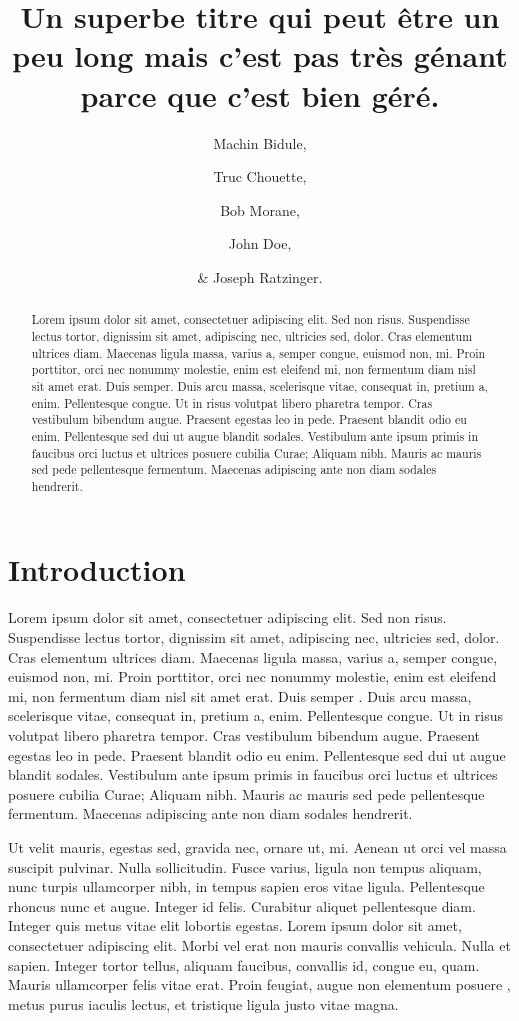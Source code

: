 \documentclass[a4paper,12pt]{article}
\title{Un superbe titre qui peut être un peu long mais c'est pas très génant parce que
  c'est bien géré.}
\author{Machin Bidule, \and Truc Chouette, \and Bob Morane, \and John Doe, \and \& Joseph
  Ratzinger.}
\begin{document}
\maketitle


\begin{abstract}
  Lorem ipsum dolor sit amet, consectetuer adipiscing elit. Sed non risus. Suspendisse
  lectus tortor, dignissim sit amet, adipiscing nec, ultricies sed, dolor. Cras elementum
  ultrices diam. Maecenas ligula massa, varius a, semper congue, euismod non, mi. Proin
  porttitor, orci nec nonummy molestie, enim est eleifend mi, non fermentum diam nisl sit
  amet erat. Duis semper. Duis arcu massa, scelerisque vitae, consequat in, pretium a,
  enim. Pellentesque congue. Ut in risus volutpat libero pharetra tempor. Cras vestibulum
  bibendum augue. Praesent egestas leo in pede. Praesent blandit odio eu
  enim. Pellentesque sed dui ut augue blandit sodales. Vestibulum ante ipsum primis in
  faucibus orci luctus et ultrices posuere cubilia Curae; Aliquam nibh. Mauris ac mauris
  sed pede pellentesque fermentum. Maecenas adipiscing ante non diam sodales hendrerit.
\end{abstract}


\newpage


\section*{Introduction}

Lorem ipsum dolor sit amet, consectetuer adipiscing elit. Sed non risus. Suspendisse
lectus tortor, dignissim sit amet, adipiscing nec, ultricies sed, dolor. Cras elementum
ultrices diam. Maecenas ligula massa, varius a, semper congue, euismod non, mi. Proin
porttitor, orci nec nonummy molestie, enim est eleifend mi, non fermentum diam nisl sit
amet erat. Duis semper \citep{Bivand_2007,Broeseth_2007_REP}. Duis arcu massa, scelerisque
vitae, consequat in, pretium a, enim. Pellentesque congue. Ut in risus volutpat libero
pharetra tempor. Cras vestibulum bibendum augue. Praesent egestas leo in pede. Praesent
blandit odio eu enim. Pellentesque sed dui ut augue blandit sodales. Vestibulum ante ipsum
primis in faucibus orci luctus et ultrices posuere cubilia Curae; Aliquam nibh. Mauris ac
mauris sed pede pellentesque fermentum. Maecenas adipiscing ante non diam sodales
hendrerit.

Ut velit mauris, egestas sed, gravida nec, ornare ut, mi. Aenean ut orci vel massa
suscipit pulvinar. Nulla sollicitudin. Fusce varius, ligula non tempus aliquam, nunc
turpis ullamcorper nibh, in tempus sapien eros vitae ligula. Pellentesque rhoncus nunc et
augue. Integer id felis. Curabitur aliquet pellentesque diam. Integer quis metus vitae
elit lobortis egestas. Lorem ipsum dolor sit amet, consectetuer adipiscing elit. Morbi vel
erat non mauris convallis vehicula. Nulla et sapien. Integer tortor tellus, aliquam
faucibus, convallis id, congue eu, quam. Mauris ullamcorper felis vitae erat. Proin
feugiat, augue non elementum posuere \citep{Bullard_1991_MTh}, metus purus iaculis lectus,
et tristique ligula justo vitae magna.
\end{document}

